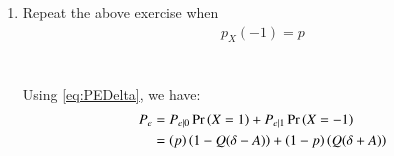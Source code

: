 \documentclass[journal,12pt,twocolumn]{IEEEtran}
\renewcommand\thesection{\arabic{section}}
\begin{document}
\begin{enumerate}[label=\thesection.\arabic*
,ref=\thesection.\theenumi]
	Similarly
	\begin{align}
		P_{e|1} &= \pr{\hat{X} = 1|X = -1} \\
		&= \frac{\pr{\hat{X} = 1, X = -1}}{\pr{X = -1}} \\
		&= \frac{\pr{Y > \delta, X = -1}}{\pr{X = -1}} \\
		&= \pr{-A + N > \delta} \\
		&= \pr{N > \delta + A} \\
		&= Q(\delta + A)
		\label{eq:PE1Delta}
	\end{align}
	
	We can write
	\begin{align}
		P_e &= P_{e|0} \pr{X = 1} + P_{e|1} \pr{X = -1} \\
		\label{eq:PEDelta}
		&= \frac{1}{2}\left( 1 - Q(\delta - A) + Q(\delta + A) \right)
	\end{align}
	
	To minimise this, we will find the value at $A$ when
	\begin{align}
		\frac{dP_e}{dA} = 0 
	\end{align}
	\begin{align}
		\frac{1}{2} \frac{d}{dA}\left( 1 - Q(\delta - A) + Q(\delta + A) \right) = 0
	\end{align}
	\begin{align}
		\frac{e^{-\frac{\left( \delta - A\right)^2}{2}}}{\sqrt{2\pi}} - \frac{e^{-\frac{\left( \delta + A\right)^2}{2}}}{\sqrt{2\pi}} = 0
	\end{align}
	\begin{align}
		e^{-\frac{\left( \delta - A\right)^2}{2}} = e^{-\frac{\left( \delta + A\right)^2}{2}}
	\end{align}
	\begin{align}
		\frac{\left( \delta - A\right)^2}{2} = \frac{\left( \delta + A\right)^2}{2}
	\end{align}
	\begin{align}
		\left( \delta - A\right)^2 = \left( \delta + A\right)^2 \\
	\end{align}
	\begin{align}
		\delta = 0
		\label{eq:AValue}
	\end{align}
	

\item Repeat the above exercise when 
	\begin{align}
		p_{X}(-1) = p
	\end{align}
	\\
	\solution
	\\
	Using \eqref{eq:PEDelta}, we have:
	\begin{align}
		P_e &= P_{e|0} \Pr\left(X = 1\right) + P_{e|1} \Pr\left(X = -1\right) \\
		&= \left(p\right) \left(1 - Q(\delta-A)\right) + \left(1-p\right) \left(Q(\delta+A)\right)
	\end{align}


\end{enumerate}
\end{document}
